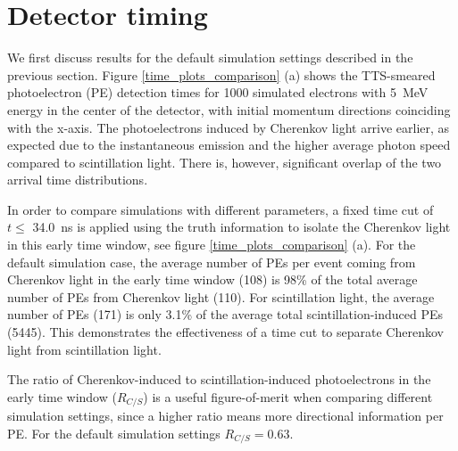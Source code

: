 \documentclass[cits]{JINST}
\begin{document}
\section{Detector timing}
\label{detector_timing_sec}

We first discuss results for the default simulation settings described
in the previous section. Figure \ref{time_plots_comparison} (a) shows
the TTS-smeared photoelectron (PE) detection times for 1000 simulated
electrons with 5~MeV energy in the center of the detector, with initial
momentum directions coinciding with the x-axis. The photoelectrons
induced by Cherenkov light arrive earlier, as expected due to the
instantaneous emission and the higher average photon speed compared to
scintillation light. There is, however, significant overlap of the two
arrival time distributions.

In order to compare simulations with different parameters, a fixed
time cut of $t\leq$ 34.0~ns is applied using the truth information to
isolate the Cherenkov light in this early time window, see figure \ref{time_plots_comparison} (a). For the default
simulation case, the average number of PEs per event coming from
Cherenkov light in the early time window (108) is 98\% of the total
average number of PEs from Cherenkov light (110). For scintillation
light, the average number of PEs (171) is only 3.1\% of the average total
scintillation-induced PEs (5445). This demonstrates the effectiveness of
a time cut to separate Cherenkov light from scintillation light. 

The ratio of Cherenkov-induced to scintillation-induced photoelectrons
in the early time window ($R_{C/S}$) is a useful figure-of-merit when
comparing different simulation settings, since a higher ratio means
more directional information per PE. For the default simulation
settings $R_{C/S}=0.63$.
\end{document}
